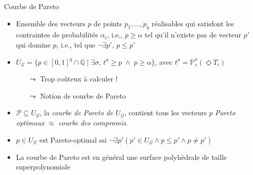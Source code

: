 \documentclass[compress]{beamer}
\theoremstyle{theorem}%
\begin{document}
\begin{frame}{Courbe de Pareto}
  \small
  \begin{itemize}
    \item Ensemble des vecteurs $p$ de {\color{fibeamer@orange}points $p_1, \dots, p_q$ réalisables} qui satisfont les contraintes de probabilités $\alpha_i$, i.e., $p \geq \alpha$ {\color{fibeamer@orange}tel qu'il n'existe pas de vecteur $p'$ qui domine $p$}, i.e., tel que $\neg {\exists} p', \, p \leq p'$
    \item $U_\mathcal{Q} = \{ p \in [0, 1]^q \cap \mathbb{Q} \; | \; \exists \sigma, \, t^\sigma \geq p \; \wedge \; p \geq \alpha \}$, avec $t^\sigma = \mathbb{P}_s^\sigma(\Diamond T_i)$
    \begin{itemize}
      \item[$\leadsto$] Trop coûteux à calculer !
      \item[$\leadsto$] Notion de courbe de Pareto
    \end{itemize}
    \item $\mathcal{P} \subseteq U_\mathcal{Q}$, la \textit{\color{fibeamer@orange}courbe de Pareto de $U_\mathcal{Q}$}, contient tous les vecteurs $p$ \textit{\color{fibeamer@orange}Pareto optimaux} $\approx$ \textit{courbe des compromis}.
    \item $p \in U_\mathcal{Q}$ est Pareto-optimal ssi $\neg \exists p' (p'\in U_\mathcal{Q} \wedge p \leq p' \wedge p \neq p')$
    \item La courbe de Pareto est en général une surface polyhèdrale de taille superpolynomiale
  \end{itemize}
\end{frame}
\end{document}
